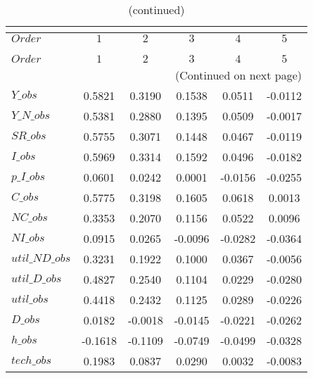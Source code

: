  
\begin{center}
\begin{longtable}{lccccc} 
\caption{COEFFICIENTS OF AUTOCORRELATION}\\
 \label{Table:th_autocorr_matrix}\\
\toprule 
$Order          $	 & 	 $          1$	 & 	 $          2$	 & 	 $          3$	 & 	 $          4$	 & 	 $          5$\\
\midrule \endfirsthead 
\caption{(continued)}\\
 \toprule \\ 
$Order          $	 & 	 $          1$	 & 	 $          2$	 & 	 $          3$	 & 	 $          4$	 & 	 $          5$\\
\midrule \endhead 
\midrule \multicolumn{6}{r}{(Continued on next page)} \\ \bottomrule \endfoot 
\bottomrule \endlastfoot 
$Y\_obs         $	 & 	     0.5821	 & 	     0.3190	 & 	     0.1538	 & 	     0.0511	 & 	    -0.0112 \\ 
$Y\_N\_obs      $	 & 	     0.5381	 & 	     0.2880	 & 	     0.1395	 & 	     0.0509	 & 	    -0.0017 \\ 
$SR\_obs        $	 & 	     0.5755	 & 	     0.3071	 & 	     0.1448	 & 	     0.0467	 & 	    -0.0119 \\ 
$I\_obs         $	 & 	     0.5969	 & 	     0.3314	 & 	     0.1592	 & 	     0.0496	 & 	    -0.0182 \\ 
$p\_I\_obs      $	 & 	     0.0601	 & 	     0.0242	 & 	     0.0001	 & 	    -0.0156	 & 	    -0.0255 \\ 
$C\_obs         $	 & 	     0.5775	 & 	     0.3198	 & 	     0.1605	 & 	     0.0618	 & 	     0.0013 \\ 
$NC\_obs        $	 & 	     0.3353	 & 	     0.2070	 & 	     0.1156	 & 	     0.0522	 & 	     0.0096 \\ 
$NI\_obs        $	 & 	     0.0915	 & 	     0.0265	 & 	    -0.0096	 & 	    -0.0282	 & 	    -0.0364 \\ 
$util\_ND\_obs  $	 & 	     0.3231	 & 	     0.1922	 & 	     0.1000	 & 	     0.0367	 & 	    -0.0056 \\ 
$util\_D\_obs   $	 & 	     0.4827	 & 	     0.2540	 & 	     0.1104	 & 	     0.0229	 & 	    -0.0280 \\ 
$util\_obs      $	 & 	     0.4418	 & 	     0.2432	 & 	     0.1125	 & 	     0.0289	 & 	    -0.0226 \\ 
$D\_obs         $	 & 	     0.0182	 & 	    -0.0018	 & 	    -0.0145	 & 	    -0.0221	 & 	    -0.0262 \\ 
$h\_obs         $	 & 	    -0.1618	 & 	    -0.1109	 & 	    -0.0749	 & 	    -0.0499	 & 	    -0.0328 \\ 
$tech\_obs      $	 & 	     0.1983	 & 	     0.0837	 & 	     0.0290	 & 	     0.0032	 & 	    -0.0083 \\ 
\end{longtable}
 \end{center}
